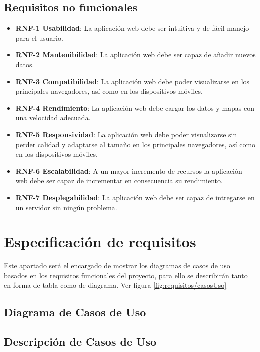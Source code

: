 \begin{itemize}
\subsection{Requisitos no funcionales}
\begin{itemize}
	\item \textbf{RNF-1 Usabilidad}: La aplicación web debe ser intuitiva y de fácil manejo para el usuario.
	\item \textbf{RNF-2 Mantenibilidad}: La aplicación web debe ser capaz de añadir nuevos datos.
	\item \textbf{RNF-3 Compatibilidad}: La aplicación web debe poder visualizarse en los principales navegadores, así como en los dispositivos móviles.
	\item \textbf{RNF-4 Rendimiento}: La aplicación web debe cargar los datos y mapas con una velocidad adecuada.
	\item \textbf{RNF-5 Responsividad}: La aplicación web debe poder visualizarse sin perder calidad y adaptarse al tamaño en los principales navegadores, así como en los dispositivos móviles. 
	\item \textbf{RNF-6 Escalabilidad}: A un mayor incremento de recursos la aplicación web debe ser capaz de incrementar en consecuencia su rendimiento.
	\item \textbf{RNF-7 Desplegabilidad}: La aplicación web debe ser capaz de intregarse en un servidor sin ningún problema.
	\end{itemize}
\end{itemize}

\section{Especificación de requisitos}

Este apartado será el encargado de mostrar los diagramas de casos de uso basados en los requisitos funcionales del proyecto, para ello se describirán tanto en forma de tabla como de diagrama. Ver figura \ref{fig:requisitos/casosUso}

\subsection{Diagrama de Casos de Uso}

\subsection{Descripción de Casos de Uso}


